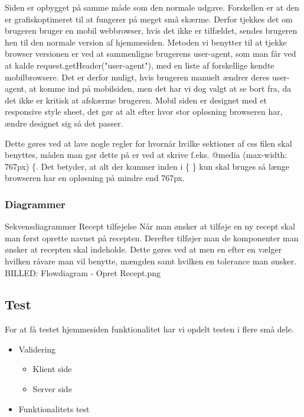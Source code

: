 \documentclass[a4paper]{article}
\begin{document}
Siden er opbygget på samme måde som den normale udgave. Forskellen er at den er grafiskoptimeret til at fungerer på meget små skærme. Derfor tjekkes det om brugeren bruger en mobil webbrowser, hvis det ikke er tilfældet, sendes brugeren hen til den normale version af hjemmesiden. Metoden vi benytter til at tjekke browser versionen er ved at sammenligne brugerens user-agent, som man får ved at kalde request.getHeader("user-agent"), med en liste af forskellige kendte mobilbrowsere. Det er derfor muligt, hvis brugeren manuelt ændrer deres user-agent, at komme ind på mobilsiden, men det har vi dog valgt at se bort fra, da det ikke er kritisk at afskærme brugeren.  Mobil siden er designet med et responsive style sheet, det gør at alt efter hvor stor opløsning browseren har, ændre designet sig så det passer.

Dette gøres ved at lave nogle regler for hvornår hvilke sektioner af css filen skal benyttes, måden man gør dette på er ved at skrive f.eks. @media (max-width: 767px) \{. Det betyder, at alt der kommer inden i \{ \} kun skal bruges så længe browseren har en opløsning på mindre end 767px.


\subsubsection{Diagrammer} %

Sekvensdiagrammer
Recept tilføjelse
Når man ønsker at tilføje en ny recept skal man først oprette navnet på recepten. Derefter tilføjer man de komponenter man ønsker at recepten skal indeholde. Dette gøres ved at men en efter en vælger hvilken råvare man vil benytte, mængden samt hvilken en tolerance man ønsker. 
BILLED: Flowdiagram - Opret Recept.png




\subsection{Test} %

For at få testet hjemmesiden funktionalitet har vi opdelt testen i flere små dele.

\begin{itemize}
  \item Validering
    \begin{itemize}
      \item Klient side
      \item Server side
    \end{itemize}
\item Funktionalitets test
\end{itemize}
\end{document}
